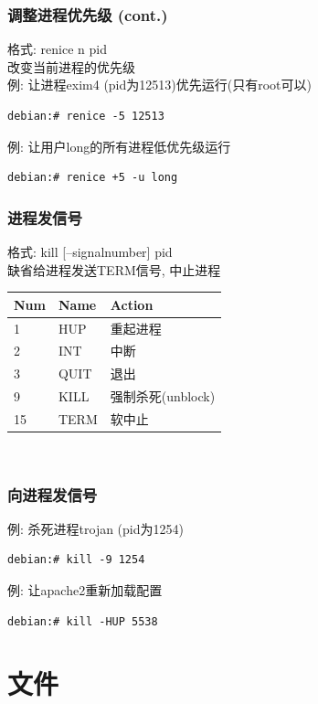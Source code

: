\documentclass[compress]{beamer}
\begin{document}
\begin{frame}[containsverbatim]
\frametitle{调整进程优先级 (cont.)}
格式: \alert{renice} n pid \\
改变当前进程的优先级\\
例: 让进程exim4 (pid为12513)优先运行(只有root可以)\\
\begin{Verbatim}
debian:# renice -5 12513
\end{Verbatim}

例: 让用户long的所有进程低优先级运行\\
\begin{Verbatim}
debian:# renice +5 -u long
\end{Verbatim}


\end{frame}

\begin{frame}[containsverbatim]
\frametitle{进程发信号}

格式: \alert{kill} [--signalnumber] pid\\
缺省给进程发送TERM信号, 中止进程\\

\begin{tabular}{p{3cm}p{3cm}p{9cm}}\hline
Num & Name & Action\\ \hline
1 & HUP & 重起进程 \\
2 & INT & 中断 \\
3 & QUIT & 退出 \\
9 & KILL & 强制杀死(unblock)\\
15 & TERM & 软中止 \\ \hline
\end{tabular}\\


\end{frame}

\begin{frame}[containsverbatim]
\frametitle{向进程发信号}

例: 杀死进程trojan (pid为1254)\\
\begin{Verbatim}
debian:# kill -9 1254
\end{Verbatim}

例: 让apache2重新加载配置 \\
\begin{Verbatim}
debian:# kill -HUP 5538
\end{Verbatim}
\end{frame}

\section{文件}
\end{document}
